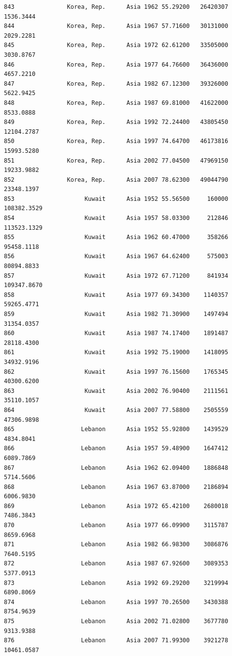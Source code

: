 \documentclass[
  letterpaper,
  DIV=11,
  numbers=noendperiod]{scrreprt}
\begin{document}
\begin{verbatim}
843               Korea, Rep.      Asia 1962 55.29200   26420307   1536.3444
844               Korea, Rep.      Asia 1967 57.71600   30131000   2029.2281
845               Korea, Rep.      Asia 1972 62.61200   33505000   3030.8767
846               Korea, Rep.      Asia 1977 64.76600   36436000   4657.2210
847               Korea, Rep.      Asia 1982 67.12300   39326000   5622.9425
848               Korea, Rep.      Asia 1987 69.81000   41622000   8533.0888
849               Korea, Rep.      Asia 1992 72.24400   43805450  12104.2787
850               Korea, Rep.      Asia 1997 74.64700   46173816  15993.5280
851               Korea, Rep.      Asia 2002 77.04500   47969150  19233.9882
852               Korea, Rep.      Asia 2007 78.62300   49044790  23348.1397
853                    Kuwait      Asia 1952 55.56500     160000 108382.3529
854                    Kuwait      Asia 1957 58.03300     212846 113523.1329
855                    Kuwait      Asia 1962 60.47000     358266  95458.1118
856                    Kuwait      Asia 1967 64.62400     575003  80894.8833
857                    Kuwait      Asia 1972 67.71200     841934 109347.8670
858                    Kuwait      Asia 1977 69.34300    1140357  59265.4771
859                    Kuwait      Asia 1982 71.30900    1497494  31354.0357
860                    Kuwait      Asia 1987 74.17400    1891487  28118.4300
861                    Kuwait      Asia 1992 75.19000    1418095  34932.9196
862                    Kuwait      Asia 1997 76.15600    1765345  40300.6200
863                    Kuwait      Asia 2002 76.90400    2111561  35110.1057
864                    Kuwait      Asia 2007 77.58800    2505559  47306.9898
865                   Lebanon      Asia 1952 55.92800    1439529   4834.8041
866                   Lebanon      Asia 1957 59.48900    1647412   6089.7869
867                   Lebanon      Asia 1962 62.09400    1886848   5714.5606
868                   Lebanon      Asia 1967 63.87000    2186894   6006.9830
869                   Lebanon      Asia 1972 65.42100    2680018   7486.3843
870                   Lebanon      Asia 1977 66.09900    3115787   8659.6968
871                   Lebanon      Asia 1982 66.98300    3086876   7640.5195
872                   Lebanon      Asia 1987 67.92600    3089353   5377.0913
873                   Lebanon      Asia 1992 69.29200    3219994   6890.8069
874                   Lebanon      Asia 1997 70.26500    3430388   8754.9639
875                   Lebanon      Asia 2002 71.02800    3677780   9313.9388
876                   Lebanon      Asia 2007 71.99300    3921278  10461.0587

\end{verbatim}
\end{document}
